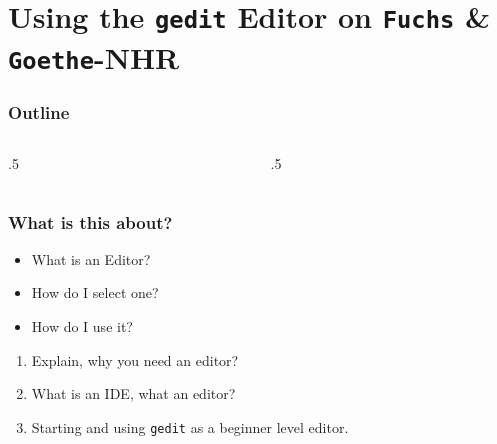 \section{Using the \texttt{gedit} Editor on \texttt{Fuchs} \& \texttt{Goethe}-NHR}

\ifdefined\ishandout
{
	\frame{
		\tableofcontents[currentsection]
	}
}
\else
\begin{frame}
	\frametitle{Outline}
	\begin{columns}[t]
		\begin{column}{.5\textwidth}
			\tableofcontents[sections={1-9},currentsection]
		\end{column}
		\begin{column}{.5\textwidth}
			\tableofcontents[sections={10-18},currentsection]
		\end{column}
	\end{columns}
\end{frame}
\fi

\begin{frame}
	\frametitle{What is this about?}
	\begin{question}[Questions]\begin{itemize}
			\item What is an Editor?
			\item How do I select one?
			\item How do I use it?
		\end{itemize}
	\end{question}
	\begin{docs}[Objectives]
		\begin{enumerate}
			\item Explain, why you need an editor?
			\item What is an IDE, what an editor?
			\item Starting and using \texttt{gedit} as a beginner level editor.
		\end{enumerate}
	\end{docs}
\end{frame}

